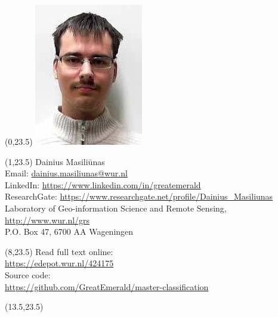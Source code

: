 \documentclass[20pt]{beamer}
\begin{document}
\begin{frame}{}
	\begin{textblock}{1}(0,23.5)
		\includegraphics[height=1\TPHorizModule]{figures/dainius.jpeg}
	\end{textblock}
	
	\begin{textblock}{7}(1,23.5)
		\small{\color{wursignblue}
            Dainius Masiliūnas\\
			Email: \url{dainius.masiliunas@wur.nl}\\
			LinkedIn: \url{https://www.linkedin.com/in/greatemerald} \\
			ResearchGate: \url{https://www.researchgate.net/profile/Dainius_Masiliunas} \\
			Laboratory of Geo-information Science and Remote Sensing, \url{http://www.wur.nl/grs}\\
			P.O. Box 47, 6700 AA Wageningen
		}
	\end{textblock}
	
	\begin{textblock}{5}(8,23.5)
        Read full text online: \\ \url{https://edepot.wur.nl/424175} \\
        Source code: \\ \url{https://github.com/GreatEmerald/master-classification}
	\end{textblock}
	
	\begin{textblock}{2}(13.5,23.5)
	\end{textblock}


  \end{frame}
\end{document}
